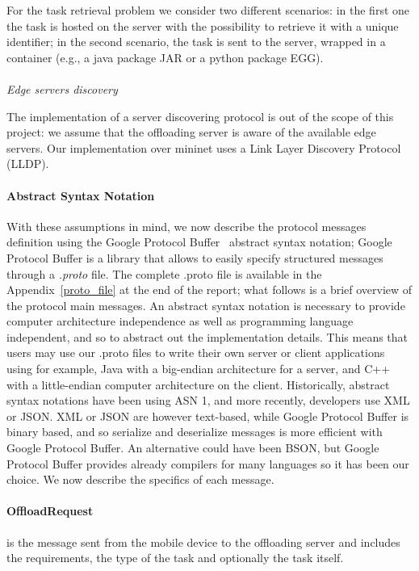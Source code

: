For the task retrieval problem we consider two different scenarios: in the first one the task is hosted on the server with the possibility to retrieve it with a unique identifier; in the second scenario, the task is sent to the server, wrapped in a container (e.g., a java package JAR or a python package EGG).\\\\
\textit{Edge servers discovery}

The implementation of a server discovering protocol is out of the scope of this project: we assume that the offloading server is aware of the available edge servers. Our implementation over mininet uses a Link Layer Discovery Protocol (LLDP).

\paragraph{Abstract Syntax Notation} 
With these assumptions in mind, we now describe the protocol messages definition using the Google Protocol Buffer~\cite{protobuf} abstract syntax notation; Google Protocol Buffer is a library that allows to easily specify structured messages through a \textit{.proto} file. The complete .proto file is available in the Appendix~\ref{proto_file} at the end of the report; what follows is a brief overview of the protocol main messages. An abstract syntax notation is necessary to provide computer architecture independence as well as programming language independent, and so to abstract out the implementation details. This means that users may use our .proto files to write their own server or client applications using for example, Java with a big-endian architecture for a server, and C++ with a little-endian computer architecture on the client. Historically, abstract syntax notations have been using ASN 1, and more recently, developers use XML or JSON. XML or JSON are however text-based, while Google Protocol Buffer is binary based, and so  serialize and deserialize messages  is more efficient with Google Protocol Buffer. An alternative could have been BSON, but Google Protocol Buffer provides already compilers for many languages so it has been our choice. We now describe the specifics of each message.

\paragraph{OffloadRequest} is the message sent from the mobile device to the offloading server and includes the requirements, the type of the task and optionally the task itself.


